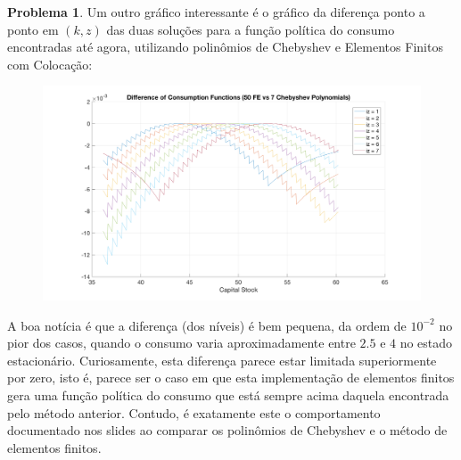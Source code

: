 \documentclass[11pt]{article}
\theoremstyle{definition}
\newtheorem{prob}{Problema}
\theoremstyle{solution}
\begin{document}
\begin{prob}
	Um outro gráfico interessante é o gráfico da diferença ponto a ponto em $(k, z)$ das duas soluções para a função política do consumo encontradas até agora, utilizando polinômios de Chebyshev e Elementos Finitos com Colocação:
	\begin{figure}[h!]
		\centering
		\includegraphics[scale = 0.2]{cheby_fe}
	\end{figure}
	
	A boa notícia é que a diferença (dos níveis) é bem pequena, da ordem de $10^{-2}$ no pior dos casos, quando o consumo varia aproximadamente entre $2.5$ e $4$ no estado estacionário. Curiosamente, esta diferença parece estar limitada superiormente por zero, isto é, parece ser o caso em que esta implementação de elementos finitos gera uma função política do consumo que está sempre acima daquela encontrada pelo método anterior. Contudo, é exatamente este o comportamento documentado nos slides ao comparar os polinômios de Chebyshev e o método de elementos finitos.
\end{prob}
\end{document}
